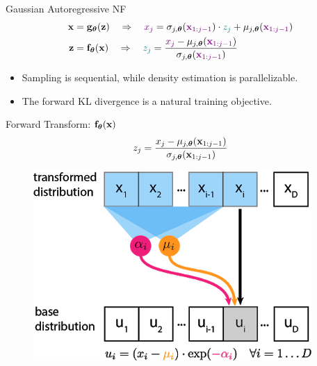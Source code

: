 \documentclass{beamer}
\begin{document}
\begin{frame}{Gaussian Autoregressive NF}
	\vspace{-0.5cm}
	\begin{align*}
		\mathbf{x} &= \mathbf{g}_{\boldsymbol{\theta}}(\mathbf{z}) \quad \Rightarrow \quad {\color{violet} x_j} = \sigma_{j, \boldsymbol{\theta}} ({\color{violet} \mathbf{x}_{1:j-1}}) \cdot {\color{teal} z_j} + \mu_{j, \boldsymbol{\theta}}({\color{violet} \mathbf{x}_{1:j-1}}) \\
		\mathbf{z} &= \mathbf{f}_{\boldsymbol{\theta}}(\mathbf{x}) \quad \Rightarrow \quad {\color{teal} z_j} = \frac{{\color{violet}x_j} - \mu_{j, \boldsymbol{\theta}}({\color{violet}\mathbf{x}_{1:j-1}})}{\sigma_{j, \boldsymbol{\theta}} ({\color{violet}\mathbf{x}_{1:j-1}})}
	\end{align*}
	
	\begin{itemize}
		\item Sampling is sequential, while density estimation is parallelizable.
		\item The forward KL divergence is a natural training objective.
	\end{itemize}
	\vspace{-0.3cm}
	
	\begin{minipage}[t]{0.65\columnwidth}
		\begin{block}{Forward Transform: $\mathbf{f}_{\boldsymbol{\theta}}(\mathbf{x})$}
			\[
				z_j = \frac{x_j - \mu_{j, \boldsymbol{\theta}}(\mathbf{x}_{1:j-1})}{\sigma_{j, \boldsymbol{\theta}} (\mathbf{x}_{1:j-1}) }
			\]
			\vspace{-0.4cm}
		\end{block}
	\end{minipage}%
	\begin{minipage}[t]{0.35\columnwidth}
		\begin{figure}[h]
			\centering
			\includegraphics[width=.9\linewidth]{figs/af_iaf_explained_2.png}
		\end{figure}
	\end{minipage} \\
	

\end{frame}
\end{document}
